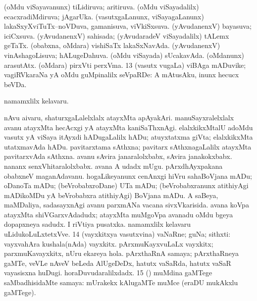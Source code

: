 {{ (oMdu viSayavanunx) tiLidiruva; aritiruva.
 (oMdu viSayadalilx) ecacxradiMdiruva; jAgarUka.
 (vasutxgaLanunx, viSayagaLanunx)
lakaSxyXviTuTx--noVDuva, gamanisuva, viVkiSxsuva. 
(yAvudanenxV) bayasuva; iciCxsuva.  (yAvudanenxV)
sahisada; (yAvudaradeV viSayadalilx) tALemx
geTaTx.  (obabxna, oMdara) vishiSaTx
lakaSxNavAda.  (yAvudanenxV) vinAshagoLisuva;
hALugeDahuva.  (oMdu viSayada) sUcakavAda.  (oMdanunx) arasutAtx.
 (oMdara) pirxVti perxVma.
\num{13} (vasutx \mo vugaLa) viBAga mADuvike; vagiRVkaraNa yA oMdu
guMpinalilx seVpaRDe:  A mAtusAku, inunx hecucx
beVDa. 

 namamxlilx kelavaru.

 nAvu aivaru, 
shaturxgaLalelxlalx atayxMta apAyakAri. 
manuSayxralelxlalx avanu atayxMta hecAcxgi yA atayxMta
kaniSaThxnAgi.  elalxkikxMtalU
adoMdu vasutx yA viSaya itAyxdi  hADugaLalilx
hADu; atuyxtatxma giVta; elalxkikxMta utatxmavAda hADu.  pavitarxtama sAthxna; pavitarx sAthxnagaLalilx atayxMta
pavitarxvAda sAthxna.
 avanu sAvira janaralolxbabx, sAvira
janakokxbabx.  nananx
senxVhitaralolxbabx.  avana A udadx mUgu. 
 pArxdhAyxpakana obabxneV
maganAdavanu.  hogaLikeyanunx cenAnxgi
hiVru  sahaBoVjana mADu; oDanoTa mADu;
(beVrobabxroDane) UTa mADu; (beVrobabxranunx atithiyAgi mADikoMDu yA
beVrobabxra atithiyAgi) BoVjana mADu.
 A saBeya, maMDaliya, sadasayxnAgi
avanu parxmANa vacana sivxVkarisida.  avana koVpa atayxMta shiVGarxvAdadudx; atayxMta muMgoVpa
avanadu  oMdu bgeya dopapxneya sadudx.  I riVtiya pusatxka.  namamxlilx
kelavaru uLidukoLuLxtetxVve. 
\num{14} (vayxkitxya vasutxvina) vaNaRne; guNa; sithxti:  vayxvahAra kushala(nAda) vayxkitx. 
pArxmuKayxvuLaLx vayxkitx; parxmuKavayxkitx, 
nUru ekareya hola.  pArxthaRnA samaya;
pArxthaRneya gaMTe, veVLe  nAveV beLeda
AlUgeDeDx,  hatutx vaSaRda, hatutx vaSaR
vayasisxna huDugi.
 horaDuvudaralilxdadx.
\num{15} (\ame) muMdina gaMTege saMbadhisidaMte samaya:  mUrakekx kAlugaMTe muMce (eraDU mukAkxlu gaMTege).}}

